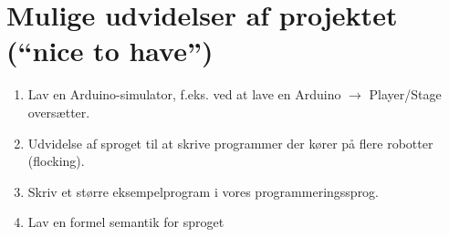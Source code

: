 \documentclass[a4paper,oneside, draft]{memoir}
\begin{document}
\section{Mulige udvidelser af projektet ("`nice to have"')}
\begin{enumerate}

\item Lav en Arduino-simulator, f.eks. ved at lave en Arduino $\rightarrow$
  Player/Stage oversætter.

\item Udvidelse af sproget til at skrive programmer der kører på flere robotter (flocking).

\item Skriv et større eksempelprogram i vores programmeringssprog.

\item Lav en formel semantik for sproget

\end{enumerate}









\end{document}
